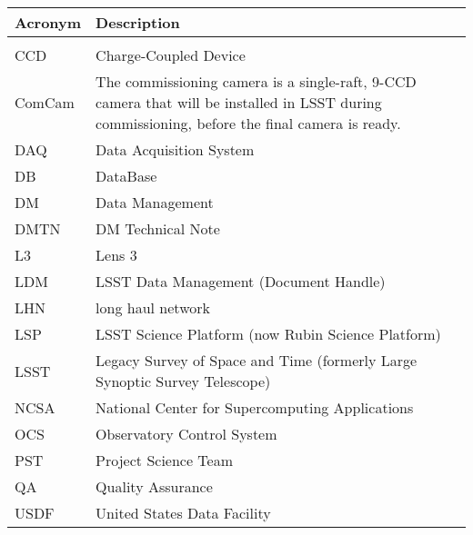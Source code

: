 \addtocounter{table}{-1}
\begin{longtable}{p{}p{}}\hline
\textbf{Acronym} & \textbf{Description}  \\\hline

 &  \\\hline
CCD & Charge-Coupled Device \\\hline
ComCam & The commissioning camera is a single-raft, 9-CCD camera that will be installed in LSST during commissioning, before the final camera is ready. \\\hline
DAQ & Data Acquisition System \\\hline
DB & DataBase \\\hline
DM & Data Management \\\hline
DMTN & DM Technical Note \\\hline
L3 & Lens 3 \\\hline
LDM & LSST Data Management (Document Handle) \\\hline
LHN & long haul network \\\hline
LSP & LSST Science Platform (now Rubin Science Platform) \\\hline
LSST & Legacy Survey of Space and Time (formerly Large Synoptic Survey Telescope) \\\hline
NCSA & National Center for Supercomputing Applications \\\hline
OCS & Observatory Control System \\\hline
PST & Project Science Team \\\hline
QA & Quality Assurance \\\hline
USDF & United States Data Facility \\\hline
\end{longtable}
